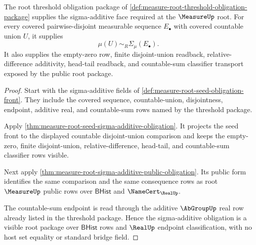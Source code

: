 \begin{theorem}
\label{thm:measure-root-threshold-sigma-additive-obligation}
The root threshold obligation package of
\autoref{def:measure-root-threshold-obligation-package} supplies the
sigma-additive face required at the $\MeasureUp$ root. For every covered
pairwise-disjoint measurable sequence $E_\bullet$ with covered countable
union $U$, it supplies
$$
\mu(U)\sim_R\Sigma_\mu(E_\bullet).
$$
It also supplies the empty-zero row, finite disjoint-union readback,
relative-difference additivity, head-tail readback, and countable-sum
classifier transport exposed by the public root package.
\end{theorem}
\begin{proof}
Start with the sigma-additive fields of
\autoref{def:measure-root-seed-obligation-front}. They include the covered
sequence, countable-union, disjointness, endpoint, additive real, and
countable-sum rows named by the threshold package.

Apply \autoref{thm:measure-root-seed-sigma-additive-obligation}. It projects
the seed front to the displayed countable disjoint-union comparison and keeps
the empty-zero, finite disjoint-union, relative-difference, head-tail, and
countable-sum classifier rows visible.

Next apply \autoref{thm:measure-root-sigma-additive-public-obligation}. Its
public form identifies the same comparison and the same consequence rows as
root $\MeasureUp$ public rows over $\mathsf{BHist}$ and $\NameCert_{\RealUp}$.

The countable-sum endpoint is read through the additive $\AbGroupUp$ real row
already listed in the threshold package. Hence the sigma-additive obligation
is a visible root package over $\mathsf{BHist}$ rows and $\RealUp$ endpoint
classification, with no host set equality or standard bridge field.
\end{proof}

